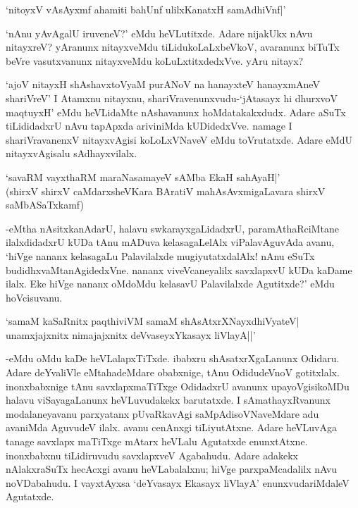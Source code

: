 \begin{shloka}
`nitoyxV vAsAyxmf ahamiti bahUnf ulilxKanatxH samAdhiVnf|'
\end{shloka}

`nAnu yAvAgalU iruveneV?' eMdu heVLutitxde. Adare nijakUkx nAvu nitayxreV? yAranunx nitayxveMdu tiLidukoLaLxbeVkoV, avaranunx biTuTx beVre vasutxvanunx nitayxveMdu koLuLxtitxdedxVve. yAru nitayx?

`ajoV nitayxH shAshavxtoV\s yaM purANoV na hanayxteV hanayxmAneV shariVreV' I Atamxnu nitayxnu, shariVravenunxvudu-`jAtasayx hi dhurxvoV maqtuyxH' eMdu heVLidaMte nAshavanunx hoMdatakakxdudx. Adare aSuTx tiLididadxrU nAvu tapApxda ariviniMda kUDidedxVve. namage I shariVravanenxV nitayxvAgisi koLoLxVNaveV eMdu toVrutatxde. Adare eMdU nitayxvAgisalu sAdhayxvilalx.

\begin{shloka}
`savaRM vayxthaRM maraNasamayeV sAMba EkaH sahAyaH|'\\
(shirxV shirxV caMdarxsheVKara BAratiV mahAsAvxmigaLavara shirxV\\
saMbASaTxkamf)
\end{shloka}

-eMtha nAsitxkanAdarU, halavu swkarayxgaLidadxrU, paramAthaRciMtane ilalxdidadxrU kUDa tAnu mADuva kelasagaLelAlx viPalavAguvAda avanu, `hiVge nananx kelasagaLu Palavilalxde mugiyutatxdalAlx! nAnu eSuTx budidhxvaMtanAgidedxVne. nananx viveVcaneyalilx savxlapxvU kUDa kaDame ilalx. Eke hiVge nananx oMdoMdu kelasavU Palavilalxde Agutitxde?' eMdu hoVcisuvanu.

\begin{shloka}
`samaM kaSaRnitx paqthiviVM samaM shAsAtxrXNayxdhiVyateV|\\
unamxjajxnitx nimajajxnitx deVvaseyxYkasayx liVlayA||'
\end{shloka}

-eMdu oMdu kaDe heVLalapxTiTxde. ibabxru shAsatxrXgaLanunx Odidaru. Adare deYvaliVle eMtahadeMdare obabxnige, tAnu OdidudeVnoV gotitxlalx. inonxbabxnige tAnu savxlapxmaTiTxge OdidadxrU avanunx upayoVgisikoMDu halavu viSayagaLanunx heVLuvudakekx barutatxde. I sAmathayxRvanunx modalaneyavanu parxyatanx pUvaRkavAgi saMpAdisoVNaveMdare adu avaniMda AguvudeV ilalx. avanu cenAnxgi tiLiyutAtxne. Adare heVLuvAga tanage savxlapx maTiTxge mAtarx heVLalu Agutatxde enunxtAtxne. inonxbabxnu tiLidiruvudu savxlapxveV Agabahudu. Adare adakekx nAlakxraSuTx hecAcxgi avanu heVLabalalxnu; hiVge parxpaMcadalilx nAvu noVDabahudu. I vayxtAyxsa `deYvasayx Ekasayx liVlayA' enunxvudariMdaleV Agutatxde.

